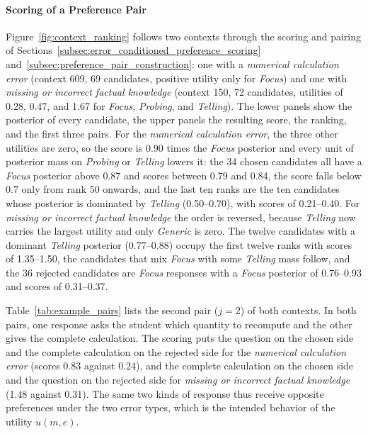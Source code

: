     \paragraph{Scoring of a Preference Pair}
    Figure~\ref{fig:context_ranking} follows two contexts through the scoring and pairing of Sections~\ref{subsec:error_conditioned_preference_scoring} and~\ref{subsec:preference_pair_construction}: one with a \textit{numerical calculation error} (context 609, 69 candidates, positive utility only for \textit{Focus}) and one with \textit{missing or incorrect factual knowledge} (context 150, 72 candidates, utilities of 0.28, 0.47, and 1.67 for \textit{Focus}, \textit{Probing}, and \textit{Telling}). The lower panels show the posterior of every candidate, the upper panels the resulting score, the ranking, and the first three pairs. For the \textit{numerical calculation error}, the three other utilities are zero, so the score is 0.90 times the \textit{Focus} posterior and every unit of posterior mass on \textit{Probing} or \textit{Telling} lowers it: the 34 chosen candidates all have a \textit{Focus} posterior above 0.87 and scores between 0.79 and 0.84, the score falls below 0.7 only from rank 50 onwards, and the last ten ranks are the ten candidates whose posterior is dominated by \textit{Telling} (0.50--0.70), with scores of 0.21--0.40. For \textit{missing or incorrect factual knowledge} the order is reversed, because \textit{Telling} now carries the largest utility and only \textit{Generic} is zero. The twelve candidates with a dominant \textit{Telling} posterior (0.77--0.88) occupy the first twelve ranks with scores of 1.35--1.50, the candidates that mix \textit{Focus} with some \textit{Telling} mass follow, and the 36 rejected candidates are \textit{Focus} responses with a \textit{Focus} posterior of 0.76--0.93 and scores of 0.31--0.37.

    Table~\ref{tab:example_pairs} lists the second pair (\(j=2\)) of both contexts. In both pairs, one response asks the student which quantity to recompute and the other gives the complete calculation. The scoring puts the question on the chosen side and the complete calculation on the rejected side for the \textit{numerical calculation error} (scores 0.83 against 0.24), and the complete calculation on the chosen side and the question on the rejected side for \textit{missing or incorrect factual knowledge} (1.48 against 0.31). The same two kinds of response thus receive opposite preferences under the two error types, which is the intended behavior of the utility \(u(m,e)\).

